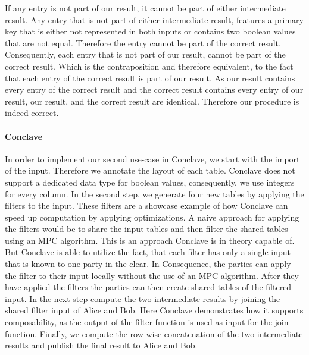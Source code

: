 If any entry is not part of our result, it cannot be part of either intermediate result. Any entry that is not part of either intermediate result, features a primary key that is either not represented in both inputs or contains two boolean values that are not equal.
Therefore the entry cannot be part of the correct result. Consequently, each entry that is not part of our result, cannot be part of the correct result. Which is the contraposition and therefore equivalent, to the fact that each entry of the correct result is part of our result. 
As our result contains every entry of the correct result and the correct result contains every entry of our result, our result, and the correct result are identical. Therefore our procedure is indeed correct.

\paragraph{Conclave}
In order to implement our second use-case in Conclave, we start with the import of the input. Therefore we annotate the layout of each table. Conclave does not support a dedicated data type for boolean values, consequently, we use integers for every column. In the second step, we generate four new tables by applying the filters to the input. These filters are a showcase example of how Conclave can speed up computation by applying optimizations.
A naive approach for applying the filters would be to share the input tables and then filter the shared tables using an MPC algorithm. This is an approach Conclave is in theory capable of. But Conclave is able to utilize the fact, that each filter has only a single input that is known to one party in the clear. In Consequence, the parties can apply the filter to their input locally without the use of an MPC algorithm. After they have applied the filters the parties can then create shared tables of the filtered input. In the next step compute the two intermediate results by joining the shared filter input of Alice and Bob. Here Conclave demonstrates how it supports composability, as the output of the filter function is used as input for the join function.  
Finally, we compute the row-wise concatenation of the two intermediate results and publish the final result to Alice and Bob.   

